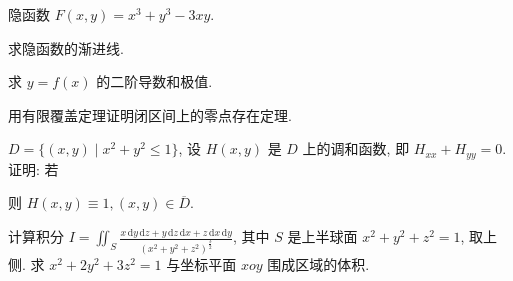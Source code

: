 隐函数 $F(x, y) = x^3 + y^3 - 3xy$.\par
求隐函数的渐进线.\par
求  $y = f(x)$  的二阶导数和极值.\par
\par{}
用有限覆盖定理证明闭区间上的零点存在定理.\par
\par{}
\par{}
$D = \{(x,y) \mid x^2 + y^2 \leq 1\}$, 设 $H(x,y)$ 是 $D$ 上的调和函数, 即 $H_{xx} + H_{yy} = 0$. 证明: 若\par
\nopagebreak[4]
则 $H(x,y)\equiv 1,(x,y)\in \overline{D}.$\par
\par{}
计算积分 $I = \iint_{S} \frac{x \, \mathrm{d}y \, \mathrm{d}z + y \, \mathrm{d}z \, \mathrm{d}x + z \, \mathrm{d}x \, \mathrm{d}y}{(x^2 + y^2 + z^2)^{\frac{3}{2}}}$, 其中 $S$ 是上半球面 $x^2 + y^2 + z^2 = 1$, 取上侧.
求 $x^{2} + 2y^{2} + 3z^{2} = 1$ 与坐标平面 $xoy$ 围成区域的体积.\par
